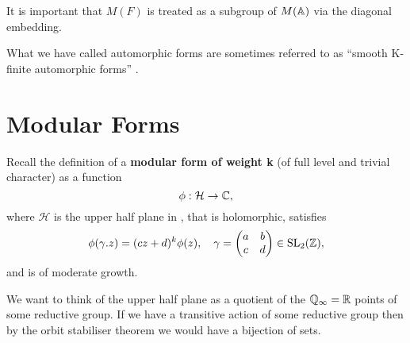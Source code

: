 \begin{remark}
    It is important that \(M(F)\) is treated as a subgroup of \(M(\A)\) via the diagonal embedding.
\end{remark}
\begin{remark}
	What we have called automorphic forms are sometimes referred to as ``smooth K-finite automorphic forms'' \cite[2.2]{cogdellLecturesLfunctionsConverse}.
\end{remark}
	
    

\section{Modular Forms} \label{sec:modular-forms}

	Recall the definition of a \textbf{modular form of weight k} (of full level and trivial character) \cite[1.1.2]{diamondFirstCourseModular2005} as a function
		\[\phi: \mathcal{H} \to \C,\]
		where \(\mathcal{H}\) is the upper half plane in \C, that is holomorphic, satisfies 
		\[\phi(\gamma.z) = (cz+d)^k\phi(z), \quad \gamma = \begin{pmatrix}
			a &b \\
			c &d
		\end{pmatrix}\in \SL_2(\Z),\]
		and is of moderate growth.

	We want to think of the upper half plane as a quotient of the \(\Q_\infty = \R\) points of some reductive group. If we have a transitive action of some reductive group then by the orbit stabiliser theorem we would have a bijection of sets.

